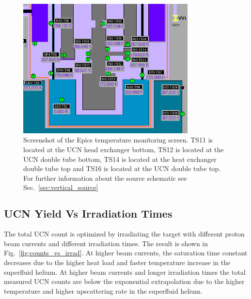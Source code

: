 \begin{figure}[h!]
  \centering
  \includegraphics[width=0.8\textwidth]{TSs.png}
  \caption{Screenshot of the Epics temperature monitoring screen. TS11
    is located at the UCN head exchanger bottom, TS12 is located at
    the UCN double tube bottom, TS14 is located at the heat exchanger
    double tube top and TS16 is located at the UCN double tube
    top. For further information about the source schematic see
    Sec.~\ref{sec:vertical_source} }
  \label{fig:TSs}
\end{figure}





\subsection{UCN Yield Vs Irradiation Times}
The total UCN count is optimized by irradiating the target with
different proton beam currents and different irradiation times. The
result is shown in Fig.~\ref{fig:counts_vs_irrad}. At higher beam
currents, the saturation time constant decreases due to the higher
heat load and faster temperature increase in the superfluid helium. At
higher beam currents and longer irradiation times the total measured
UCN counts are below the exponential extrapolation due to the higher
temperature and higher upscattering rate in the superfluid helium.

